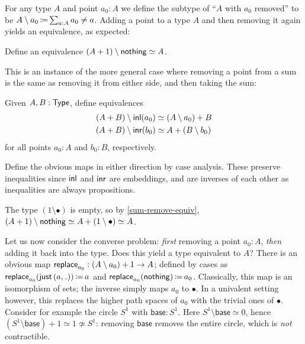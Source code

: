 For any type \( A \) and point \( a_0 : A \) we define the subtype of \enquote{\( A \) with \( a_0 \) removed}
to be \( A \setminus a_0 \operatorname{\mathrel{\coloneq}} \sum_{a : A} a_0 \neq a \).
Adding a point to a type \( A \) and then removing it again yields an equivalence, as expected:
\begin{problem}\label{maybe-minus-nothing-equiv}
  Define an equivalence \( (A + 1) \setminus \operatorname{\mathsf{nothing}} \simeq A \).
\end{problem}

This is an instance of the more general case where removing a point from a sum
is the same as removing it from either side, and then taking the sum:
\begin{problem}\label{sum-remove-equiv}
  Given \( A, B : \operatorname{\mathsf{Type}} \), define equivalences
  \begin{align*}
    (A + B) \setminus \operatorname{\mathsf{inl}}(a_0) &\simeq (A \setminus a_0) + B \\
    (A + B) \setminus \operatorname{\mathsf{inr}}(b_0) &\simeq A + (B \setminus b_0)
  \end{align*}
  for all points \( a_0 : A \) and \( b_0 : B \), respectively.
  \begin{construction}
    Define the obvious maps in either direction by case analysis.
    These preserve inequalities since \( \operatorname{\mathsf{inl}} \) and \( \operatorname{\mathsf{inr}} \) are embeddings,
    and are inverses of each other as inequalities are always propositions.
  \end{construction}
\end{problem}

\begin{construction}[note={for \autoref{maybe-minus-nothing-equiv}}]
  The type \( (1 \setminus \bullet) \) is empty,
  so by \autoref{sum-remove-equiv}, \( (A + 1) \setminus \operatorname{\mathsf{nothing}} \simeq A + (1 \setminus \bullet) \simeq A \).
\end{construction}

Let us now consider the converse problem:
\emph{first} removing a point \( a_0 : A \), \emph{then} adding it back into the type.
Does this yield a type equivalent to \( A \)?
There is an obvious map \( \operatorname{\mathsf{replace}}_{a_0} : (A \setminus a_0) + 1 \to A \);
defined by cases
as
\(
  \Replace_{a_0}(\Just{(a, \mathunderscore)}) \DefEq a
\)
and
\(
  \operatorname{\mathsf{replace}}_{a_0}(\operatorname{\mathsf{nothing}}) \operatorname{\mathrel{\coloneq}} a_0
\).
Classically, this map is an isomorphism of sets;
the inverse simply maps \( a_0 \) to \( \bullet \).
In a univalent setting however, this replaces the higher path spaces of \( a_0 \)
with the trivial ones of \( \bullet \).
Consider for example the circle \( S^1 \) with \( \mathsf{base} : S^1 \).
Here \( S^1 \setminus \mathsf{base} \simeq 0 \),
hence \( (S^1 \setminus \mathsf{base}) + 1 \simeq 1 \not\simeq S^1 \):
removing \( \mathsf{base} \) removes the entire circle, which is \emph{not} contractible.

